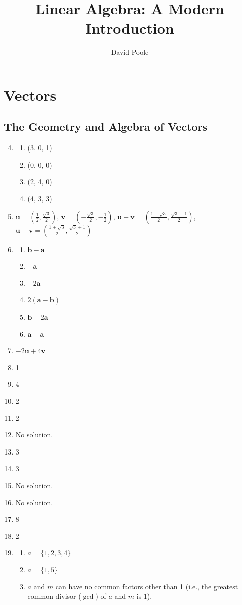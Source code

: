 \documentclass{article}
\title{Linear Algebra: A Modern Introduction}
\author{David Poole}
\date{}
\begin{document}
\maketitle
\section{Vectors}
\subsection{The Geometry and Algebra of Vectors}
\begin{enumerate}
    \setcounter{enumi}{3}
  \item
    \begin{enumerate}
      \item (3, 0, 1)
      \item (0, 0, 0)
      \item (2, 4, 0)
      \item (4, 3, 3)
    \end{enumerate}
    \setcounter{enumi}{12}
  \item $\mathbf{u}=(\frac{1}{2}, \frac{\sqrt{3}}{2})$,
    $\mathbf{v}=(-\frac{\sqrt{3}}{2}, -\frac{1}{2})$,
    $\mathbf{u}+\mathbf{v}=(\frac{1-\sqrt{3}}{2}, \frac{\sqrt{3}-1}{2})$,
    $\mathbf{u}-\mathbf{v}=(\frac{1+\sqrt{3}}{2}, \frac{\sqrt{3}+1}{2})$
  \item
    \begin{enumerate}
      \item $\mathbf{b}-\mathbf{a}$
      \item $-\mathbf{a}$
      \item $-2\mathbf{a}$
      \item $2(\mathbf{a}-\mathbf{b})$
      \item $\mathbf{b}-2\mathbf{a}$
      \item $\mathbf{a}-\mathbf{a}$
    \end{enumerate}
    \setcounter{enumi}{20}
  \item $-2\mathbf{u}+4\mathbf{v}$
    \setcounter{enumi}{39}
  \item 1
    \setcounter{enumi}{43}
  \item 4
  \item 2
  \item 2
  \item No solution.
  \item 3
  \item 3
  \item No solution.
  \item No solution.
  \item 8
  \item 2
    \setcounter{enumi}{56}
  \item
    \begin{enumerate}
      \item $a=\{1, 2, 3, 4\}$
      \item $a=\{1, 5\}$
      \item $a$ and $m$ can have no common factors other than 1 (i.e., the greatest common
        divisor ($\gcd$) of $a$ and $m$ is 1).
    \end{enumerate}
\end{enumerate}
\end{document}
